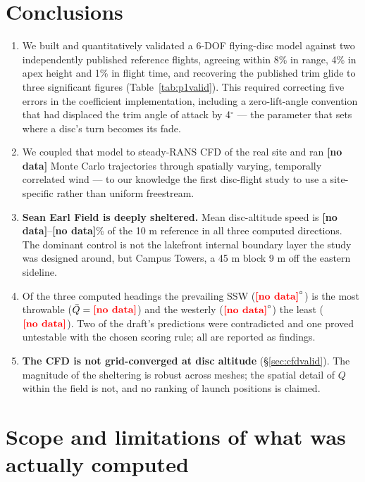 \documentclass[11pt,letterpaper]{article}
\newcommand{\MISSINGNUM}{\textbf{\color{red}[no data]}}%
\newcommand{\UfieldFracMin}{\MISSINGNUM}\newcommand{\UfieldFracMax}{\MISSINGNUM}%
\newcommand{\NtotalThrows}{\MISSINGNUM}\newcommand{\NthrowsPerCell}{\MISSINGNUM}%
\newcommand{\QbestHeading}{\MISSINGNUM}\newcommand{\QworstHeading}{\MISSINGNUM}%
\newcommand{\QbestMean}{\MISSINGNUM}\newcommand{\QworstMean}{\MISSINGNUM}%
\begin{document}
\section{Conclusions}
\label{sec:conclusions}

\begin{enumerate}[leftmargin=*,itemsep=3pt]
  \item We built and quantitatively validated a 6-DOF flying-disc model against
    two independently published reference flights, agreeing within 8\% in range,
    4\% in apex height and 1\% in flight time, and recovering the published trim
    glide to three significant figures (Table~\ref{tab:p1valid}). This required
    correcting five errors in the coefficient implementation, including a
    zero-lift-angle convention that had displaced the trim angle of attack by
    4$^\circ$ --- the parameter that sets where a disc's turn becomes its fade.

  \item We coupled that model to steady-RANS CFD of the real site and ran
    \NtotalThrows{} Monte Carlo trajectories through spatially varying,
    temporally correlated wind --- to our knowledge the first disc-flight study
    to use a site-specific rather than uniform freestream.

  \item \textbf{Sean Earl Field is deeply sheltered.} Mean disc-altitude speed
    is \UfieldFracMin--\UfieldFracMax\% of the 10 m reference in all three
    computed directions.
    The dominant control is not the lakefront internal boundary layer the study
    was designed around, but Campus Towers, a 45 m block 9 m off the eastern
    sideline.

  \item Of the three computed headings the prevailing SSW ($\QbestHeading^\circ$)
    is the most throwable ($\bar Q = \QbestMean$) and the westerly
    ($\QworstHeading^\circ$) the least ($\QworstMean$). Two of the draft's
    predictions were contradicted and one proved untestable with the chosen
    scoring rule; all are reported as findings.

  \item \textbf{The CFD is not grid-converged at disc altitude}
    (\S\ref{sec:cfdvalid}). The magnitude of the sheltering is robust across
    meshes; the spatial detail of $Q$ within the field is not, and no ranking of
    launch positions is claimed.
\end{enumerate}

\section{Scope and limitations of what was actually computed}
\label{sec:limits}
\end{document}
